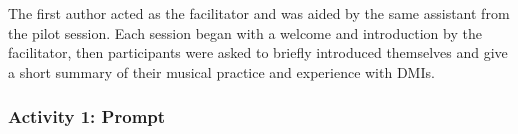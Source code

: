 \documentclass[letterpaper, 12pt]{article}
\begin{document}
The first author acted as the facilitator and was aided by the same assistant from the pilot session. Each session began with a welcome and introduction by the facilitator, then participants were asked to briefly introduced themselves and give a short summary of their musical practice and experience with DMIs. 






\subsubsection{Activity 1: Prompt}
\label{ch3-sec:activity-1-prompt}
\end{document}
